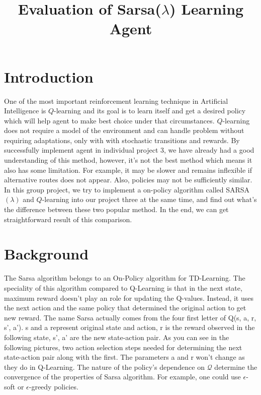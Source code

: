 \documentclass[10pt,conference]{IEEEtran}
\title{
	Evaluation of Sarsa(\(\lambda\)) Learning Agent 
	}
\author{
	\IEEEauthorblockN{Padraic Cashin \IEEEauthorrefmark{1}, 
		David Lahtinen \IEEEauthorrefmark{2}, 
		Ruihao Zhou \IEEEauthorrefmark{3},
	}
	\IEEEauthorblockA{
		\IEEEauthorrefmark{1} ASU ID: 1214153888 \\
		\IEEEauthorrefmark{2} ASU ID: 1207725034 \\
		\IEEEauthorrefmark{3} ASU ID: 1213439264 \\
	}
}
\begin{document}
\maketitle

\section{Introduction}

One of the most important reinforcement learning technique in Artificial 
Intelligence is \(Q\)-learning and its goal is to learn itself and get a 
desired policy which will help agent to make best choice under that 
circumstances. \(Q\)-learning does not require a model of the environment and 
can handle problem without requiring adaptations, only with with stochastic 
transitions and rewards. By successfully implement agent in individual project 
3, we have already had a good understanding of this method, however, it’s not 
the best method which means it also has some limitation. For example, it may 
be slower and remains inflexible if alternative routes does not appear. Also, 
policies may not be sufficiently similar. In this group project, we try to 
implement a on-policy algorithm called SARSA\((\lambda)\) and \(Q\)-learning 
into our project three at the same time, and find out what’s the difference 
between these two popular method. In the end, we can get straightforward 
result of this comparison. 

\label{sec:intro}

\section{Background}
\label{sec:background}
	
	The Sarsa algorithm belongs to an On-Policy algorithm for TD-Learning. The 
	speciality of this algorithm compared to Q-Learning is that in the next 
	state, maximum reward doesn’t play an role for updating the Q-values. 
	Instead, it uses the next action and the same policy that determined the 
	original action to get new reward. The name Sarsa actually comes from the 
	four first letter of Q(s, a, r, s', a'). s and a represent original state 
	and action, r is the reward observed in the following state, s', a' are 
	the new state-action pair. As you can see in the following pictures, two 
	action selection steps needed for determining the next state-action pair 
	along with the first. The parameters a and r won’t change as they do in 
	Q-Learning. The nature of the policy's dependence on \(\mathcal{Q}\) determine 
	the convergence of the properties of Sarsa algorithm. For example, one 
	could use \(\epsilon\)-soft or \(\epsilon\)-greedy policies. \cite{sutton18} 
	
\end{document}
